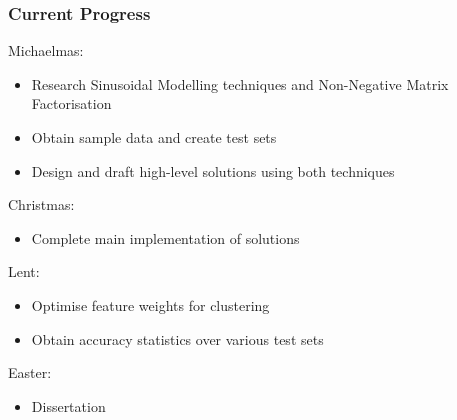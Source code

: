 \documentclass{beamer}
\begin{document}
\begin{frame}

\frametitle{Current Progress}

Michaelmas:

\begin{itemize}
\item Research Sinusoidal Modelling techniques and Non-Negative Matrix Factorisation \checkmark

\item Obtain sample data and create test sets \checkmark

\item Design and draft high-level solutions using both techniques \checkmark
\end{itemize}

Christmas:

\begin{itemize}
\item Complete main implementation of solutions \checkmark
\end{itemize}

Lent:

\begin{itemize}
\item Optimise feature weights for clustering \checkmark

\item Obtain accuracy statistics over various test sets
\end{itemize}

Easter:

\begin{itemize}
\item Dissertation
\end{itemize}

\end{frame}
\end{document}
